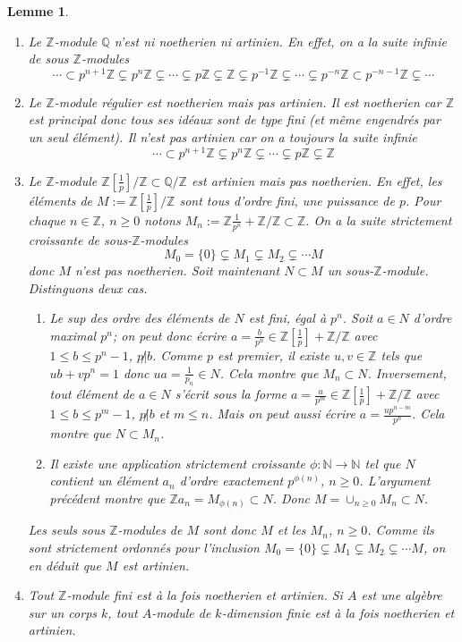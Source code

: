 \documentclass[a4paper, oneside, 12pt]{book}
\theoremstyle{theoremeStyle} %
\newtheorem{lemme}[theoreme]{Lemme}
\theoremstyle{definition} %
\newcommand{\Q}{\mathbb{Q}}
\newcommand{\Z}{\mathbb{Z}}
\newcommand{\N}{\mathbb{N}}
\begin{document}
\begin{lemme}
\begin{enumerate}[leftmargin=* ,parsep=0cm,itemsep=0cm,topsep=0cm]
	\item Le $\mathbb{Z}$-module $\Q$ n'est ni noetherien ni artinien. En effet, on a la suite infinie de sous $\Z$-modules
	$$\cdots\subset p^{n+1}\Z\subsetneq p^n\Z\subsetneq\cdots\subsetneq p\Z\subsetneq \Z\subsetneq p^{-1}\Z\subsetneq \cdots\subsetneq p^{-n}\Z\subset p^{-n-1}\Z\subsetneq \cdots $$
	\item Le $\mathbb{Z}$-module régulier est noetherien mais pas artinien. Il est noetherien car $\Z$ est principal donc tous ses idéaux sont de type fini (et m\^eme engendrés par un seul élément). Il n'est pas artinien car on a toujours la suite infinie
	$$\cdots\subset p^{n+1}\Z\subsetneq p^n\Z\subsetneq\cdots\subsetneq p\Z\subsetneq \Z$$
	\item Le $\mathbb{Z}$-module $\mathbb{Z}[\frac{1}{p}]/\mathbb{Z}\subset \Q/\Z$ est artinien mais pas noetherien. En effet, les éléments de $M:=\mathbb{Z}[\frac{1}{p}]/\mathbb{Z}$ sont tous  d'ordre fini, une puissance de $p$. Pour chaque $n\in \Z$, $n\geq 0$ notons $M_n:=\Z\frac{1}{p^n}+\Z/\Z\subset \Z$. On a la suite strictement croissante de sous-$\Z$-modules 
	$$M_0=\lbrace 0\rbrace \subsetneq M_1\subsetneq M_2\subsetneq \cdots M$$
	donc $M$ n'est pas noetherien. Soit maintenant $N\subset M$ un sous-$\Z$-module. Distinguons deux cas. 
	\begin{enumerate}
	\item Le sup des ordre des éléments de $N$ est fini, égal à  $p^n$. Soit $a\in N$ d'ordre maximal $p^n$; on peut donc écrire $a=\frac{b}{p^{n}} \in \Z[\frac{1}{p}]+\Z/\Z$ avec $1\leq b\leq p^n-1$, $p\not| b$. Comme $p$ est premier, il existe $u,v\in \Z$ tels que $ub+vp^n=1$ donc $ua=\frac{1}{p_n}\in N$. Cela montre que $M_n\subset N$. Inversement, tout élément de $a\in N$ s'écrit sous la forme $a=\frac{u}{p^m} \in \Z[\frac{1}{p}]+\Z/\Z$ avec $1\leq b\leq p^m-1$, $p\not| b$ et $m\leq n$. Mais on peut aussi écrire  $a=\frac{up^{n-m}}{p^n}$. Cela montre que $N\subset M_n$.
	\item Il existe une application strictement croissante $\phi:\N\rightarrow \N$ tel que $N$ contient un élément $a_n$ d'ordre exactement $p^{\phi(n)}$, $n\geq 0$. L'argument précédent montre que $\Z a_n=M_{\phi(n)}\subset N$. Donc $M=\cup_{n\geq 0}M_n\subset N$.
	\end{enumerate}
	Les seuls sous $\Z$-modules de $M$ sont donc $M$ et  les $M_n$, $n\geq 0$. Comme ils sont strictement ordonnés pour l'inclusion $ M_0=\lbrace 0\rbrace \subsetneq M_1\subsetneq M_2\subsetneq \cdots M$, on en déduit que $M$ est artinien.
	\item Tout $\mathbb{Z}$-module fini est à la fois noetherien et artinien. Si $A$ est une algèbre sur un corps $k$, tout $A$-module de $k$-dimension finie est à la fois noetherien et artinien.

\end{enumerate}
\end{lemme}
\end{document}
